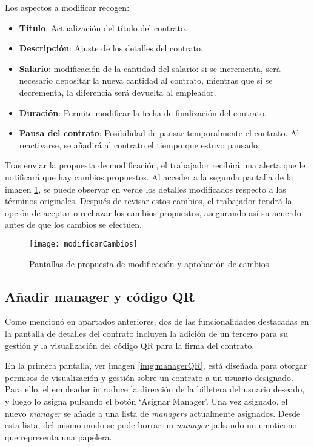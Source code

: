 Los aspectos a modificar recogen:
\begin{itemize}

\item \textbf{Título}: Actualización del título del contrato.

\item \textbf{Descripción}: Ajuste de los detalles del contrato.

\item \textbf{Salario}: modificación de la cantidad del salario: si se incrementa, será necesario depositar la nueva cantidad al contrato, mientras que si se decrementa, la diferencia será devuelta al empleador. 

\item \textbf{Duración}: Permite modificar la fecha de finalización del contrato.

\item \textbf{Pausa del contrato}: Posibilidad de pausar temporalmente el contrato. Al reactivarse, se añadirá al contrato el tiempo que estuvo pausado.

\end{itemize}

Tras enviar la propuesta de modificación, el trabajador recibirá una alerta que le notificará que hay cambios propuestos. Al acceder a la segunda pantalla de la imagen \ref{img:modificarCambios}, se puede observar en verde los detalles modificados respecto a los términos originales. Después de revisar estos cambios, el trabajador tendrá la opción de aceptar o rechazar los cambios propuestos, asegurando así su acuerdo antes de que los cambios se efectúen.

\begin{figure}[h]
	\label{img:modificarCambios}
	\centering
	\texttt{[image: modificarCambios]}
	\caption[Pantalla modificar contrato]{Pantallas de propuesta de modificación y aprobación de cambios.}
\end{figure}


\subsection{Añadir manager y código QR}

Como mencionó en apartados anteriores, dos de las funcionalidades destacadas en la pantalla de detalles del contrato incluyen la adición de un tercero para su gestión y la visualización del código QR para la firma del contrato.

En la primera pantalla, ver imagen \ref{img:managerQR}, está diseñada para otorgar permisos de visualización y gestión sobre un contrato a un usuario designado.
Para ello, el empleador introduce la dirección de la billetera del usuario deseado, y luego lo asigna pulsando el botón `Asignar Manager'.
Una vez asignado, el nuevo \textit{manager} se añade a una lista de \textit{managers} actualmente asignados. Desde esta lista, del mismo modo se pude borrar un \textit{manager} pulsando un emoticono que representa una papelera.

